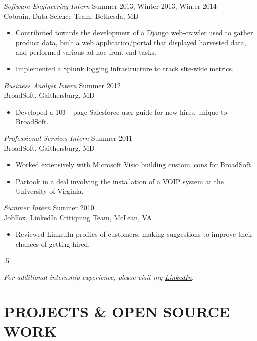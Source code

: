 \documentclass[margin=0.5in, 10pt]{res} %
\begin{document}
\begin{resume}
{\sl Software Engineering Intern} \hfill Summer 2013, Winter 2013, Winter 2014 \\
Cobrain, Data Science Team, Bethesda, MD 
\begin{itemize} 
\item Contributed towards the development of a Django web-crawler used to gather product data, built a web application/portal that displayed harvested data, and performed various ad-hoc front-end tasks.
\item Implemented a Splunk logging infrastructure to track site-wide metrics.
\end{itemize} 

{\sl Business Analyst Intern} \hfill Summer 2012 \\
BroadSoft, Gaithersburg, MD
\begin{itemize}
\item Developed a 100+ page Salesforce user guide for new hires, unique to BroadSoft.
\end{itemize}

{\sl Professional Services Intern} \hfill Summer 2011 \\
BroadSoft, Gaithersburg, MD
\begin{itemize}
\item Worked extensively with Microsoft Visio building custom icons for BroadSoft.
\item Partook in a deal involving the installation of a VOIP system at the University of Virginia.
\end{itemize} 

{\sl Summer Intern} \hfill Summer 2010 \\
JobFox, LinkedIn Critiquing Team, McLean, VA
\begin{itemize}
\item Reviewed LinkedIn profiles of customers, making suggestions to improve their chances of getting hired. \\ 
\end{itemize}


\moveleft.5\hoffset\centerline{{\sl For additional internship experience, please visit my \underline{\color{blue}\href{http://www.linkedin.com/in/grantmcgovern/}{LinkedIn}}.}}

\section{PROJECTS \& OPEN SOURCE WORK}


\end{resume}
\end{document}
